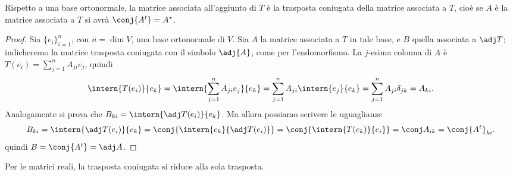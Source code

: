 \begin{teorema} \label{t:matrice-aggiunta}
	Rispetto a una base ortonormale, la matrice associata all'aggiunto di $T$ è la trasposta coniugata della matrice associata a $T$, cioè se $A$ è la matrice associata a $T$ si avrà $\conj{A^t} = A^*$.
\end{teorema}
\begin{proof}
	Sia $\{  e_i\}_{i=1}^n$, con $n=\dim V$, una base ortonormale di $V$.
	Sia $A$ la matrice associata a $T$ in tale base, e $B$ quella associata a $\adj T$; indicheremo la matrice trasposta coniugata con il simbolo $\adj{A}$, come per l'endomorfismo.
	La $j$-esima colonna di $A$ è $T(  e_i)=\sum_{j=1}^nA_{ji}  e_j$, quindi
	\begin{equation}
		\intern{T(  e_i)}{  e_k}=\intern{\sum_{j=1}^nA_{ji}  e_j}{  e_k}=\sum_{j=1}^nA_{ji}\intern{  e_j}{  e_k}=\sum_{j=1}^nA_{ji}\delta_{jk}=A_{ki}.
	\end{equation}
	Analogamente si prova che $B_{ki}=\intern{\adj T(  e_i)}{  e_k}$.
	Ma allora possiamo scrivere le uguaglianze
	 	\[
	 	B_{ki}=\intern{\adj T(  e_i)}{  e_k}=\conj{\intern{  e_k}{\adj T(  e_i)}}=\conj{\intern{T(  e_k)}{  e_i}}=\conj A_{ik}=\conj{A^t}_{ki}.
	 	\]
	quindi $B=\conj{A^t}=\adj A$.
\end{proof}
Per le matrici reali, la trasposta coniugata si riduce alla sola trasposta.


